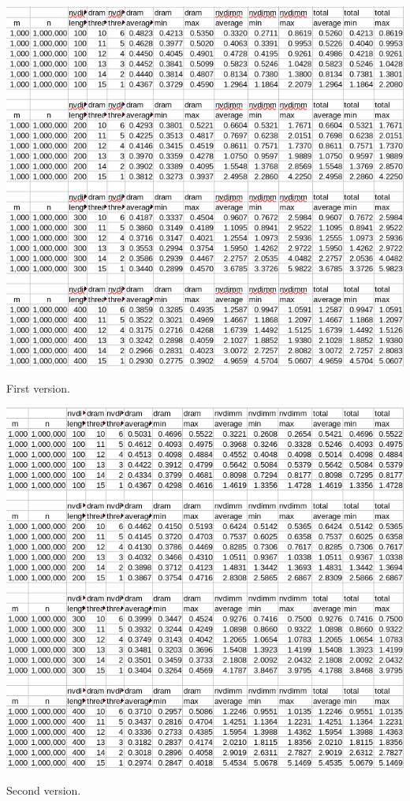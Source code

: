 \documentclass[12pt,a4paper,USenglish]{article}      %
\begin{document}
\begin{table}[!hbtp]
\includegraphics[scale=0.7]{Large_array_test_first_version_v5.png}
\caption{First version.}
\end{table}

\begin{table}[!hbtp]
\includegraphics[scale=0.7]{Large_array_test_second_version_v3.png}
\caption{Second version.}
\end{table}
\end{document}
